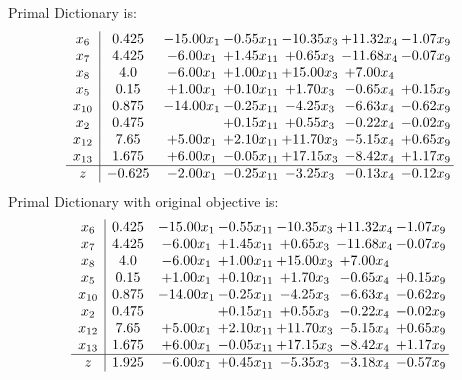 \documentclass[9pt]{article}
\begin{document}
Primal Dictionary is:
\[\begin{array}{c| c c@{\hskip 2pt} c@{\hskip 2pt} c@{\hskip 2pt} c@{\hskip 2pt} c@{\hskip 2pt} }
 x_{6}   &  0.425 & -15.00 x_{1} & -0.55 x_{11} & -10.35 x_{3} & + 11.32 x_{4} & -1.07 x_{9}\\
 x_{7}   &  4.425 & -6.00 x_{1} & +  1.45 x_{11} & +  0.65 x_{3} & -11.68 x_{4} & -0.07 x_{9}\\
 x_{8}   &  4.0 & -6.00 x_{1} & +  1.00 x_{11} & + 15.00 x_{3} & +  7.00 x_{4} &   \\
 x_{5}   &  0.15 & +  1.00 x_{1} & +  0.10 x_{11} & +  1.70 x_{3} & -0.65 x_{4} & +  0.15 x_{9}\\
 x_{10}   &  0.875 & -14.00 x_{1} & -0.25 x_{11} & -4.25 x_{3} & -6.63 x_{4} & -0.62 x_{9}\\
 x_{2}   &  0.475  &   & +  0.15 x_{11} & +  0.55 x_{3} & -0.22 x_{4} & -0.02 x_{9}\\
 x_{12}   &  7.65 & +  5.00 x_{1} & +  2.10 x_{11} & + 11.70 x_{3} & -5.15 x_{4} & +  0.65 x_{9}\\
 x_{13}   &  1.675 & +  6.00 x_{1} & -0.05 x_{11} & + 17.15 x_{3} & -8.42 x_{4} & +  1.17 x_{9}\\
\hline
z    &  -0.625 & -2.00 x_{1} & -0.25 x_{11} & -3.25 x_{3} & -0.13 x_{4} & -0.12 x_{9}\\
\end{array}\]
Primal Dictionary with original objective is:
\[\begin{array}{c| c c@{\hskip 2pt} c@{\hskip 2pt} c@{\hskip 2pt} c@{\hskip 2pt} c@{\hskip 2pt} }
 x_{6}   &  0.425 & -15.00 x_{1} & -0.55 x_{11} & -10.35 x_{3} & + 11.32 x_{4} & -1.07 x_{9}\\
 x_{7}   &  4.425 & -6.00 x_{1} & +  1.45 x_{11} & +  0.65 x_{3} & -11.68 x_{4} & -0.07 x_{9}\\
 x_{8}   &  4.0 & -6.00 x_{1} & +  1.00 x_{11} & + 15.00 x_{3} & +  7.00 x_{4} &   \\
 x_{5}   &  0.15 & +  1.00 x_{1} & +  0.10 x_{11} & +  1.70 x_{3} & -0.65 x_{4} & +  0.15 x_{9}\\
 x_{10}   &  0.875 & -14.00 x_{1} & -0.25 x_{11} & -4.25 x_{3} & -6.63 x_{4} & -0.62 x_{9}\\
 x_{2}   &  0.475  &   & +  0.15 x_{11} & +  0.55 x_{3} & -0.22 x_{4} & -0.02 x_{9}\\
 x_{12}   &  7.65 & +  5.00 x_{1} & +  2.10 x_{11} & + 11.70 x_{3} & -5.15 x_{4} & +  0.65 x_{9}\\
 x_{13}   &  1.675 & +  6.00 x_{1} & -0.05 x_{11} & + 17.15 x_{3} & -8.42 x_{4} & +  1.17 x_{9}\\
\hline
z    &  1.925 & -6.00 x_{1} & +  0.45 x_{11} & -5.35 x_{3} & -3.18 x_{4} & -0.57 x_{9}\\
\end{array}\]
\end{document}
